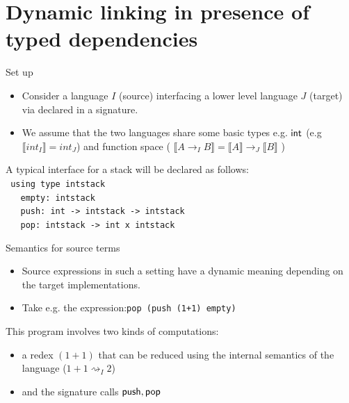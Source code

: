\documentclass{beamer}
\begin{document}
 \section{Dynamic linking in presence of typed dependencies} 
  \begin{frame}{Set up}
   \begin{itemize}
    \item Consider a language $I$ (source) interfacing a lower level language $J$ (target) via declared in a signature.
    
    \item We assume that the two languages share some basic types e.g. ${\sf int}$ 
    (e.g $\llbracket int_I\rrbracket = int_J $) 
    and function space (
    $\llbracket A\rightarrow_I B\rrbracket =\llbracket A \rrbracket \rightarrow_J \llbracket B \rrbracket $
    )
   \end{itemize}
   A typical interface for a stack will be declared as follows:\\
   \texttt{
       using type intstack\\
      \ \ \    empty: intstack\\
      \ \ \    push: int -> intstack -> intstack\\
      \ \ \    pop: intstack -> int x intstack\\
   }
  \end{frame}
   \begin{frame}{Semantics for source terms}
   \begin{itemize}
    \item Source expressions in such a setting have a 
    dynamic meaning depending on the target implementations. 
    
    \item [] Take e.g. the expression:\texttt{pop (push (1+1) empty)}\\
   \end{itemize}
    This program involves two kinds of computations: 
    \begin{itemize}
      \item a redex $(1+1)$ that can be reduced using the internal semantics of the language ($1+1\rightsquigarrow_{I} 2$) 
      \item and the signature calls ${\sf push, pop}$ 
   \end{itemize}
  \end{frame}
 
\end{document}
